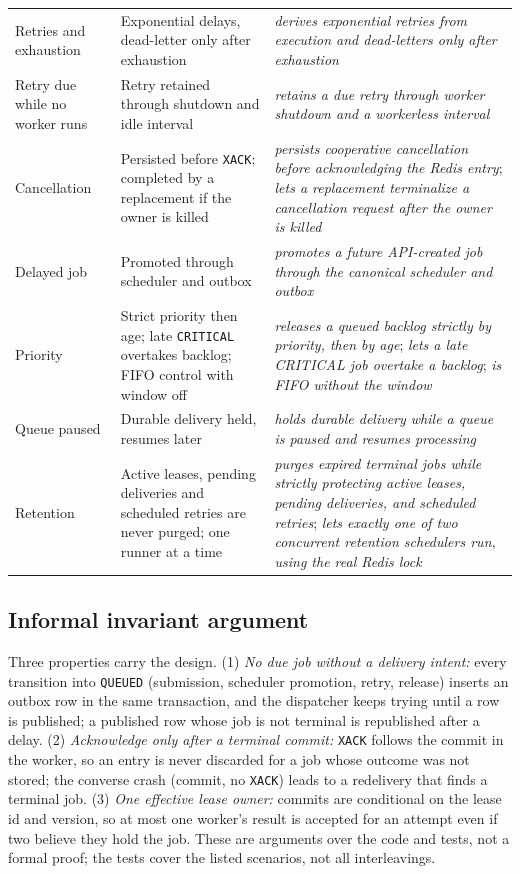 \documentclass[conference]{IEEEtran}
\newcommand{\code}[1]{\texttt{\small #1}}
\begin{document}
\begin{table}[t]
\begin{tabular}{p{4.0cm}p{5.4cm}p{6.6cm}}
Retries and exhaustion & Exponential delays, dead-letter only after exhaustion & \emph{derives exponential retries from execution and dead-letters only after exhaustion} \\
Retry due while no worker runs & Retry retained through shutdown and idle interval & \emph{retains a due retry through worker shutdown and a workerless interval} \\
Cancellation & Persisted before \code{XACK}; completed by a replacement if the owner is killed & \emph{persists cooperative cancellation before acknowledging the Redis entry}; \emph{lets a replacement terminalize a cancellation request after the owner is killed} \\
Delayed job & Promoted through scheduler and outbox & \emph{promotes a future API-created job through the canonical scheduler and outbox} \\
Priority & Strict priority then age; late \code{CRITICAL} overtakes backlog; FIFO control with window off & \emph{releases a queued backlog strictly by priority, then by age}; \emph{lets a late CRITICAL job overtake a backlog}; \emph{is FIFO without the window} \\
Queue paused & Durable delivery held, resumes later & \emph{holds durable delivery while a queue is paused and resumes processing} \\
Retention & Active leases, pending deliveries and scheduled retries are never purged; one runner at a time & \emph{purges expired terminal jobs while strictly protecting active leases, pending deliveries, and scheduled retries}; \emph{lets exactly one of two concurrent retention schedulers run, using the real Redis lock} \\
\bottomrule
\end{tabular}
\end{table}

\subsection{Informal invariant argument}
Three properties carry the design. (1) \emph{No due job without a delivery intent:} every transition into \code{QUEUED} (submission, scheduler promotion, retry, release) inserts an outbox row in the same transaction, and the dispatcher keeps trying until a row is published; a published row whose job is not terminal is republished after a delay. (2) \emph{Acknowledge only after a terminal commit:} \code{XACK} follows the commit in the worker, so an entry is never discarded for a job whose outcome was not stored; the converse crash (commit, no \code{XACK}) leads to a redelivery that finds a terminal job. (3) \emph{One effective lease owner:} commits are conditional on the lease id and version, so at most one worker's result is accepted for an attempt even if two believe they hold the job. These are arguments over the code and tests, not a formal proof; the tests cover the listed scenarios, not all interleavings.
\end{document}

